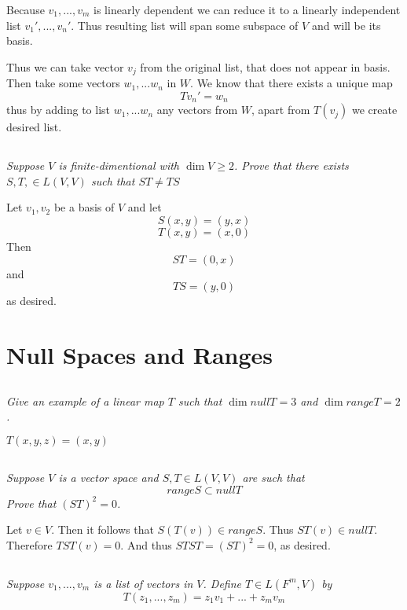 \documentclass[11pt,oneside,titlepage]{book}
\begin{document}
Because $v_1, ..., v_m$ is linearly dependent we can reduce it to a linearly independent list
$v_1', ..., v_n'$. Thus resulting list will span some subspace of $V$ and will be its basis.

Thus we can take vector $v_j$ from the original list,
that does not appear in basis.
Then take some vectors $w_1, ... w_n$ in $W$. We know that there exists a unique map
$$Tv_n' = w_n$$
thus by adding to list $w_1, ... w_n$ any vectors from $W$, apart from $T(v_j)$ we create desired
list.

\subsection{}
\textit{Suppose $V$ is finite-dimentional with $\dim V \geq 2$. Prove that there
  exists $S, T, \in L(V, V)$ such that $ST \neq TS$ }

Let $v_1, v_2$ be a basis of $V$ and let
$$ S(x, y) = (y, x)$$
$$ T(x, y) = (x, 0)$$
Then
$$ST = (0, x)$$
and
$$TS = (y, 0)$$
as desired.


\section{Null Spaces and Ranges}

\subsection{}

\textit{Give an example of a linear map $T$ such that $\dim null T = 3$ and
  $\dim range T = 2$.}

$T(x, y, z) = (x, y)$

\subsection{}

\textit{Suppose $V$ is a vector space and $S, T \in L(V, V)$ are such that }
$$range S \subset null T$$
\textit{Prove that $(ST)^2 = 0$.}

Let $v \in V$. Then it follows that $S(T(v)) \in range S$. Thus $ST(v) \in null T$.
Therefore $TST(v) = 0$. And thus  $STST = (ST)^2 = 0$, as desired.

\subsection{}
\textit{Suppose $v_1, ...,  v_m$ is a list of vectors in $V$. Define $T \in L(F^m, V)$ by}
$$T(z_1, ..., z_m) = z_1 v_1 + ... + z_m v_m$$
\end{document}
